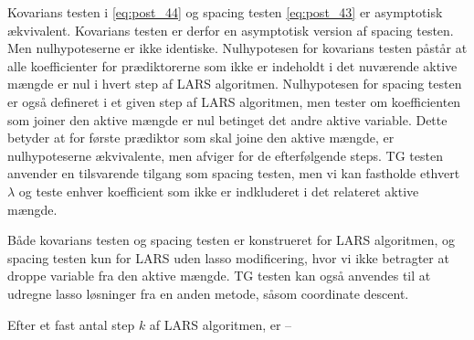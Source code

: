 Kovarians testen i \eqref{eq:post_44} og spacing testen \eqref{eq:post_43} er asymptotisk ækvivalent.
Kovarians testen er derfor en asymptotisk version af spacing testen.
Men nulhypoteserne er ikke identiske.
Nulhypotesen for kovarians testen påstår at alle koefficienter for prædiktorerne som ikke er indeholdt i det nuværende aktive mængde er nul i hvert step af LARS algoritmen.
Nulhypotesen for spacing testen er også defineret i et given step af LARS algoritmen, men tester om koefficienten som joiner den aktive mængde er nul betinget det andre aktive variable.
Dette betyder at for første prædiktor som skal joine den aktive mængde, er nulhypoteserne ækvivalente, men afviger for de efterfølgende steps.
TG testen anvender en tilsvarende tilgang som spacing testen, men vi kan fastholde ethvert \(\lambda\) og teste enhver koefficient som ikke er indkluderet i det relateret aktive mængde.

Både kovarians testen og spacing testen er konstrueret for LARS algoritmen, og spacing testen kun for LARS uden lasso modificering, hvor vi ikke betragter at droppe variable fra den aktive mængde. TG testen kan også anvendes til at udregne lasso løsninger fra en anden metode, såsom coordinate descent.



\begin{thm}
Efter et fast antal step \(k\) af LARS algoritmen, er --
\end{thm}
